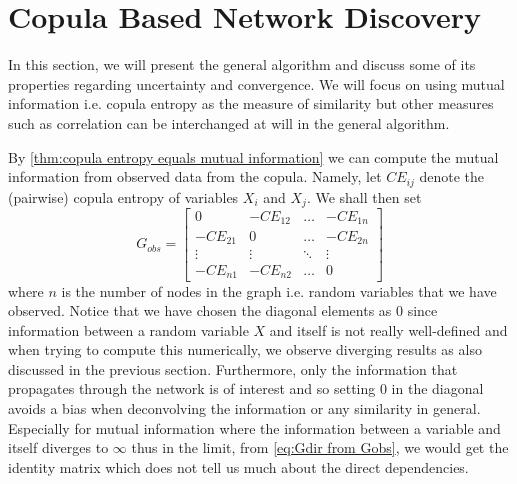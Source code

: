 \documentclass[../Thesis.tex]{subfiles}
\begin{document}
\section{Copula Based Network Discovery}\label{sec:Copula based network discovery}
In this section, we will present the general algorithm and discuss some of its properties regarding uncertainty and convergence. We will focus on using mutual information i.e. copula entropy as the measure of similarity but other measures such as correlation can be interchanged at will in the general algorithm.

By \autoref{thm:copula entropy equals mutual information} we can compute the mutual information from observed data from the copula. Namely, let $CE_{ij}$ denote the (pairwise) copula entropy of variables $X_i$ and $X_j$. We shall then set
\begin{equation}\label{eq:Gobs matrix}
    G_{obs} = \begin{bmatrix}
        0        & - CE_{12} & \dots  & - CE_{1n} \\
        -CE_{21} & 0         & \dots  & - CE_{2n} \\
        \vdots   & \vdots    & \ddots & \vdots    \\
        -CE_{n1} & -CE_{n2}  & \dots  & 0
    \end{bmatrix}
\end{equation}
where $n$ is the number of nodes in the graph i.e. random variables that we have observed. Notice that we have chosen the diagonal elements as $0$ since information between a random variable $X$ and itself is not really well-defined and when trying to compute this numerically, we observe diverging results as also discussed in the previous section. Furthermore, only the information that propagates through the network is of interest and so setting $0$ in the diagonal avoids a bias when deconvolving the information or any similarity in general. Especially for mutual information where the information between a variable and itself diverges to $\infty$ thus in the limit, from \autoref{eq:Gdir from Gobs}, we would get the identity matrix which does not tell us much about the direct dependencies.
\end{document}
